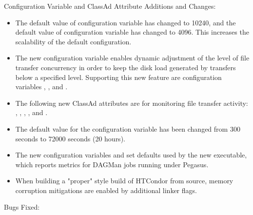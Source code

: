 \noindent Configuration Variable and ClassAd Attribute Additions and Changes:

\begin{itemize}

\item The default value of configuration variable
 has changed to 10240,
and the default value of configuration variable 
 has changed to 4096.
This increases the scalability of the default configuration.

\item The new configuration variable
 enables dynamic
adjustment of the level of file transfer concurrency in order to
keep the disk load generated by transfers below a specified level.
Supporting this new feature are configuration variables
,
, and
.

\item The following new  ClassAd attributes are for
monitoring file transfer activity:
,
,
,
, and
.

\item The default value for the configuration variable
 has been changed from 300 seconds to
72000 seconds (20 hours).

\item The new configuration variables
 and
set defaults used by the new  executable,
which reports metrics for DAGMan jobs running under Pegasus.

\item When building a "proper" style build of HTCondor from source, memory
corruption mitigations are enabled by additional linker flags.

\end{itemize}

\noindent Bugs Fixed:

